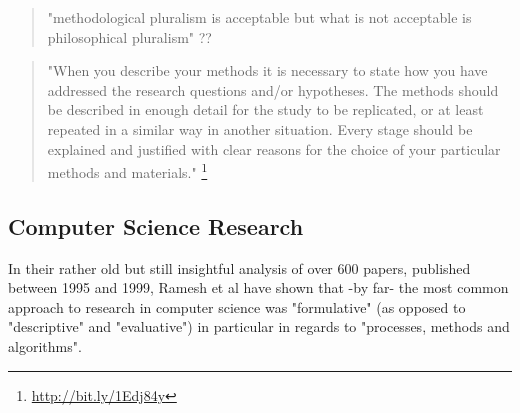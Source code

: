 \begin{quote}
  "methodological pluralism is acceptable but what is not acceptable is philosophical pluralism" ??
\end{quote}

\begin{comment}
  What would be traditional RM in those fields?\\
  Why can I not mix and match them?\\
  What do I do now/instead?\\
  Can inter/multi/trans-disciplinary research be NOT collaborative but done by a single person?
\end{comment}

\begin{quote}
  "When you describe your methods it is necessary to state how you have addressed the research questions and/or hypotheses. The methods should be described in enough detail for the study to be replicated, or at least repeated in a similar way in another situation. Every stage should be explained and justified with clear reasons for the choice of your particular methods and materials." \footnote{\url{http://bit.ly/1Edj84y}} %
\end{quote}

\subsection{Computer Science Research}

In their rather old but still insightful analysis of over 600 papers, published between 1995 and 1999, Ramesh et al \citep{Ramesh2004} have shown that -by far- the most common approach to research in computer science was "formulative" (as opposed to "descriptive" and "evaluative") in particular in regards to "processes, methods and algorithms".

